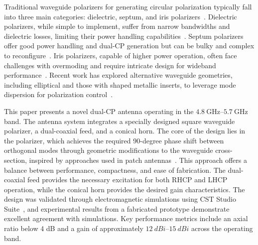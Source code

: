 \documentclass[journal]{IEEEtran}
\newcommand{\frequencyrange}{\qtyrange{4.8}{5.7}{\giga\hertz}}
\begin{document}
Traditional waveguide polarizers for generating circular polarization typically fall into three main categories: dielectric, septum, and iris polarizers~\cite{shuliak-et-al:modern-microwave-polarizers-and-their-electromagnetic-characteristics, arora-et-al:dielectric-polarizer-based-potter-horn-antenna-for-deep-space-on-board-ttc-uplink-applications}. Dielectric polarizers, while simple to implement, suffer from narrow bandwidths and dielectric losses, limiting their power handling capabilities~\cite{melendro-jimenez-et-al:a-novel-logarithmic-spiral-shaped-3d-printed-dielectirc-polarizer-for-dual-circularly-polarized-conical-beam-radiation-patterns-in-the-ka-band}. Septum polarizers offer good power handling and dual-CP generation but can be bulky and complex to reconfigure~\cite{ruiz-cruz-et-al:compact-reconfigurable-waveguide-circular-polarizer, wang-et-al:novel-square-rectangle-waveguide-septum-polarizer}. Iris polarizers, capable of higher power operation, often face challenges with overmoding and require intricate design for wideband performance~\cite{song-et-al:design-of-wideband-quad-ridge-waveguide-polarizer, virone-et-al:optimum-iris-set-concept-for-waveguide-polarizers, piltyay-et-al:new-tunable-iris-post-square-waveguide-polarizers-for-satelliste-information-systems}. Recent work has explored alternative waveguide geometries, including elliptical and those with shaped metallic inserts, to leverage mode dispersion for polarization control~\cite{yu-et-al:a-wideband-circularly-polarized-horn-antenna-with-a-tapered-elliptical-waveguide-polarizer, rud-shpachenko:polarizers-on-sections-of-square-waveguides-with-inner-corner-ridges, bhardwaj-volakis:hexagonal-waveguides-new-class-of-waveguides-for-mmwave-circularly-polarized-horns, bhardwaj-volakis:hexagonal-waveguide-based-circularly-polarized-horn-antennas-for-submmwave-terahertz-band, bhardwaj-volakis:circularly-polarized-horn-antennas-for-terahertz-communications-using-differential-mode-dispersion-in-hexagonal-waveguides, garcia-marin-masa-campos:bowtie-shaped-radiating-element-for-single-and-dual-circular-polarization}.

This paper presents a novel dual-CP antenna operating in the $\frequencyrange$ band. The antenna system integrates a specially designed square waveguide polarizer, a dual-coaxial feed, and a conical horn. The core of the design lies in the polarizer, which achieves the required 90-degree phase shift between orthogonal modes through geometric modifications to the waveguide cross-section, inspired by approaches used in patch antennas~\cite{armin-et-al:modification-of-a-2g2hz-sband-rectangular-patch-microstrip-antenna-using-truncated-corner-method-for-satellite-applications}. This approach offers a balance between performance, compactness, and ease of fabrication. The dual-coaxial feed provides the necessary excitation for both RHCP and LHCP operation, while the conical horn provides the desired gain characteristics. The design was validated through electromagnetic simulations using CST Studio Suite~\cite{cst}, and experimental results from a fabricated prototype demonstrate excellent agreement with simulations. Key performance metrics include an axial ratio below 4 dB and a gain of approximately $\qtyrange{12}{15}{dBi}$ across the operating band.
\end{document}
